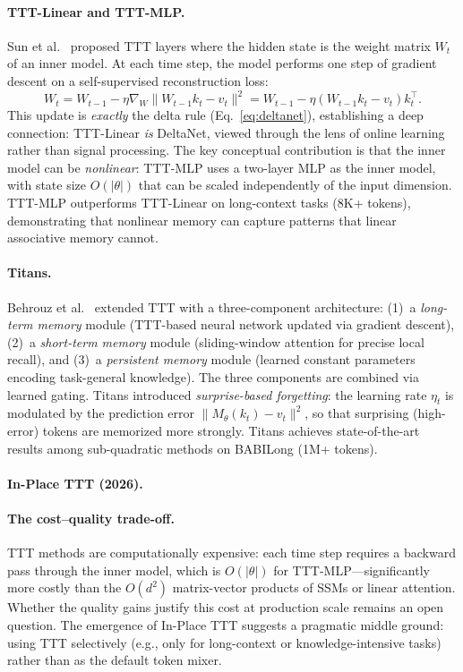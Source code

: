 \documentclass[11pt,a4paper]{article}
\begin{document}
\paragraph{TTT-Linear and TTT-MLP.}
Sun et al.~\cite{sun2024learning} proposed TTT layers where the hidden state is the weight matrix $W_t$ of an inner model. At each time step, the model performs one step of gradient descent on a self-supervised reconstruction loss:
\begin{equation}
W_t = W_{t-1} - \eta \nabla_W \|W_{t-1} k_t - v_t\|^2 = W_{t-1} - \eta (W_{t-1} k_t - v_t) k_t^\top.
\label{eq:ttt}
\end{equation}
This update is \emph{exactly} the delta rule (Eq.~\ref{eq:deltanet}), establishing a deep connection: TTT-Linear \emph{is} DeltaNet, viewed through the lens of online learning rather than signal processing. The key conceptual contribution is that the inner model can be \emph{nonlinear}: TTT-MLP uses a two-layer MLP as the inner model, with state size $O(|\theta|)$ that can be scaled independently of the input dimension. TTT-MLP outperforms TTT-Linear on long-context tasks (8K+ tokens), demonstrating that nonlinear memory can capture patterns that linear associative memory cannot.

\paragraph{Titans.}
Behrouz et al.~\cite{behrouz2024titans} extended TTT with a three-component architecture: (1)~a \emph{long-term memory} module (TTT-based neural network updated via gradient descent), (2)~a \emph{short-term memory} module (sliding-window attention for precise local recall), and (3)~a \emph{persistent memory} module (learned constant parameters encoding task-general knowledge). The three components are combined via learned gating. Titans introduced \emph{surprise-based forgetting}: the learning rate $\eta_t$ is modulated by the prediction error $\|M_\theta(k_t) - v_t\|^2$, so that surprising (high-error) tokens are memorized more strongly. Titans achieves state-of-the-art results among sub-quadratic methods on BABILong (1M+ tokens).

\paragraph{In-Place TTT (2026).}
\paragraph{The cost--quality trade-off.}
TTT methods are computationally expensive: each time step requires a backward pass through the inner model, which is $O(|\theta|)$ for TTT-MLP---significantly more costly than the $O(d^2)$ matrix-vector products of SSMs or linear attention. Whether the quality gains justify this cost at production scale remains an open question. The emergence of In-Place TTT suggests a pragmatic middle ground: using TTT selectively (e.g., only for long-context or knowledge-intensive tasks) rather than as the default token mixer.
\end{document}
